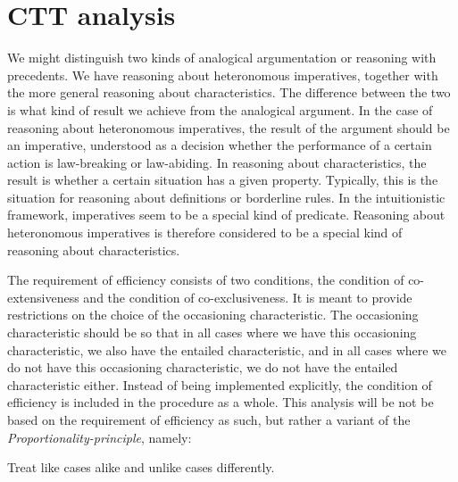 
\chapter{CTT analysis}\label{cap-CTTAnalysis}

	We might distinguish two kinds of analogical argumentation or reasoning with precedents. We have reasoning about heteronomous imperatives, together with the more general reasoning about characteristics. The difference between the two is what kind of result we achieve from the analogical argument. In the case of reasoning about heteronomous imperatives, the result of the argument should be an imperative, understood as a decision whether the performance of a certain action is law-breaking or law-abiding. In reasoning about characteristics, the result is whether a certain situation has a given property. Typically, this is the situation for reasoning about definitions or borderline rules. In the intuitionistic framework, imperatives seem to be a special kind of predicate. Reasoning about heteronomous imperatives is therefore considered to be a special kind of reasoning about characteristics. 

	The requirement of efficiency consists of two conditions, the condition of co-extensiveness and the condition of co-exclusiveness. It is meant to provide restrictions on the choice of the occasioning characteristic. The occasioning characteristic should be so that in all cases where we have this occasioning characteristic, we also have the entailed characteristic, and in all cases where we do not have this occasioning characteristic, we do not have the entailed characteristic either. Instead of being implemented explicitly, the condition of efficiency is included in the procedure as a whole. This analysis will be not be based on the requirement of efficiency as such, but rather a variant of the \textit{Proportionality-principle}, namely:
		\begin{itquote}
			Treat like cases alike and unlike cases differently.	
		\end{itquote}

